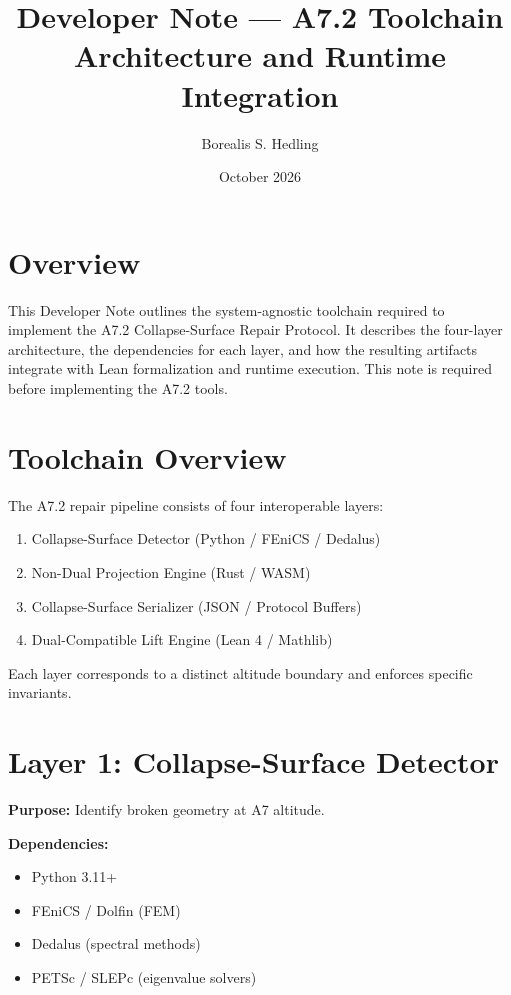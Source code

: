 \documentclass[11pt]{article}
\title{Developer Note — A7.2 Toolchain Architecture and Runtime Integration}
\author{Borealis S. Hedling}
\date{October 2026}
\begin{document}
\maketitle

\section*{Overview}

This Developer Note outlines the system-agnostic toolchain required to implement
the A7.2 Collapse-Surface Repair Protocol. It describes the four-layer
architecture, the dependencies for each layer, and how the resulting artifacts
integrate with Lean formalization and runtime execution. This note is required
before implementing the A7.2 tools.

\section{Toolchain Overview}

The A7.2 repair pipeline consists of four interoperable layers:

\begin{enumerate}
  \item Collapse-Surface Detector (Python / FEniCS / Dedalus)
  \item Non-Dual Projection Engine (Rust / WASM)
  \item Collapse-Surface Serializer (JSON / Protocol Buffers)
  \item Dual-Compatible Lift Engine (Lean 4 / Mathlib)
\end{enumerate}

Each layer corresponds to a distinct altitude boundary and enforces specific
invariants.

\section{Layer 1: Collapse-Surface Detector}

\textbf{Purpose:} Identify broken geometry at A7 altitude.

\textbf{Dependencies:}
\begin{itemize}
  \item Python 3.11+
  \item FEniCS / Dolfin (FEM)
  \item Dedalus (spectral methods)
  \item PETSc / SLEPc (eigenvalue solvers)
\end{itemize}
\end{document}
